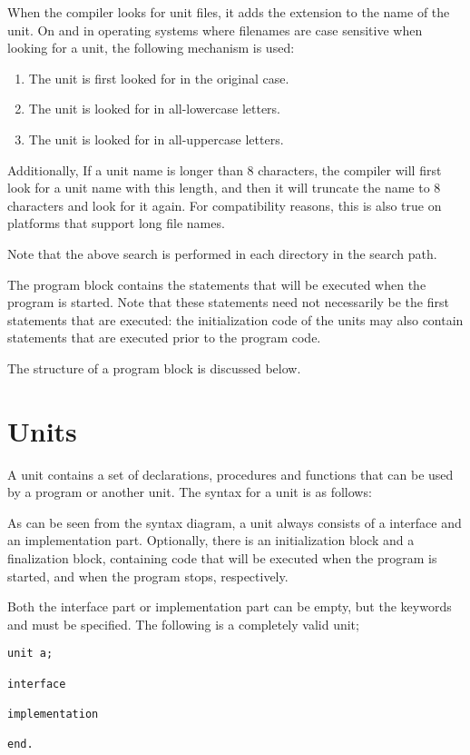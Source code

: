 When the compiler looks for unit files, it adds the extension 
to the name of the unit. On \linux and in operating systems where filenames 
are case sensitive  when looking for a unit, the following mechanism is
used:
\begin{enumerate}
\item The unit is first looked for in the original case.
\item The unit is looked for in all-lowercase letters.
\item The unit is looked for in all-uppercase letters.
\end{enumerate}
Additionally, If a unit name is longer than 8 characters, the compiler 
will first look for a unit name with this length, and then it will 
truncate the name to 8 characters and look for it again. 
For compatibility reasons, this is also true on platforms that 
support long file names.

Note that the above search is performed in each directory in the search
path. 

The program block contains the statements that will be executed when the
program is started. Note that these statements need not necessarily be the 
first statements that are executed: the initialization code of the units
may also contain statements that are executed prior to the program code.

The structure of a program block is discussed below.

\section{Units}
A unit contains a set of declarations, procedures and functions that can be
used by a program or another unit.
The syntax for a unit is as follows:

As can be seen from the syntax diagram, a unit always consists of a
interface and an implementation part. Optionally, there is an initialization
block and a finalization block, containing code that will be executed when
the program is started, and when the program stops, respectively.

Both the interface part or implementation part can be empty, but the
keywords  and  must be specified.
The following is a completely valid unit;
\begin{verbatim}
unit a;

interface

implementation

end.
\end{verbatim}

